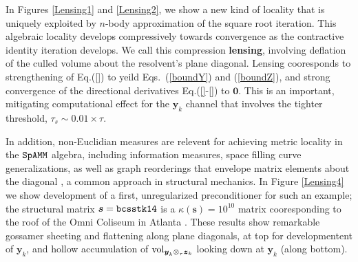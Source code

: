\documentclass[letterpaper,twocolumn,amsmath,amsfont,amssymb,english,aps,jcp,preprintnumbers,groupaddress,nofootinbib,tightenlines,floatfix]{revtex4}
\newcommand{\mat}[1]{\boldsymbol{#1}}
\newcommand{\ot}{  {\scriptstyle \otimes}_{ \tau } }
\theoremstyle{plain}
\theoremstyle{remark}
\theoremstyle{plain}
\begin{document}
In Figures \ref{Lensing1} and \ref{Lensing2},  we show a new kind of locality that is uniquely exploited by $n$-body approximation of the square root iteration. This {algebraic locality} develops compressively towards convergence as the contractive identity iteration develops.  
We call this compression {\bf lensing},  involving deflation of the culled volume about the resolvent's plane diagonal.
Lensing cooresponds to strengthening of Eq.(\ref{}) to yeild Eqs.~(\ref{boundY}) and (\ref{boundZ}), and strong convergence of the
directional derivatives Eq.(\ref{}-\ref{}) to $\mat{0}$.
This is an important, mitigating computational effect for the $\mat{y}_k$ channel that involves the 
tighter threshold, $\tau_s \sim 0.01 \times \tau$. 

In addition, non-Euclidian measures are relevent for achieving metric locality in 
the $\tt SpAMM$ algebra, including information measures, space filling curve generalizations, as well 
as graph reorderings that envelope matrix elements about the diagonal \cite{}, a common approach in 
structural mechanics.   In Figure \ref{Lensing4} we show development of a first, unregularized preconditioner 
for such an example; the structural matrix $\mat{s}={\tt bcsstk14}$ is a $\kappa(\mat{s})=10^{10}$ matrix 
cooresponding to the roof of the Omni Coliseum in Atlanta \cite{}.  These results show remarkable 
gossamer sheeting and flattening along plane diagonals, at top for developmentent of $\mat{y}_k$, 
and hollow accumulation of ${\rm vol}_{\mat{y}_k \ot \mat{z}_k}$ looking down at $\mat{y}_k$ (along bottom).
\end{document}
